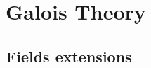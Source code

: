 \documentclass[main.tex]{subfiles}
\begin{document}
	\chapter{Galois Theory}
		\section{Fields extensions}		
\end{document}
